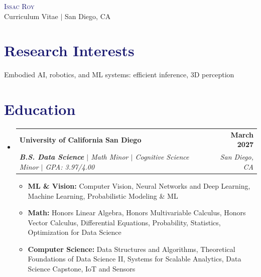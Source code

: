 \documentclass[letterpaper,11pt]{article}
\makeatletter
\newcommand{\resumeItem}[1]{
  \item\small{
    {#1\vspace{\bulletGap}}
  }
}
\newcommand{\resumeSubheading}[4]{
  \item
    \begin{tabular*}{1.0\textwidth}[t]{l@{\extracolsep{\fill}}r}
      \textbf{#1} & \textbf{\small #2} \\
      \textit{\small#3} & \textit{\small #4} \\
    \end{tabular*}\vspace{\headingGap}
}
\newcommand{\resumeSubHeadingListStart}{\begin{itemize}[leftmargin=0.0in, label={}]}
\newcommand{\resumeSubHeadingListEnd}{\end{itemize}}
\newcommand{\resumeItemListStart}{\begin{itemize}[itemsep=0pt, parsep=0pt]}
\newcommand{\resumeItemListEnd}{\end{itemize}\vspace{\entryGap}}
\newcommand{\resumeText}[1]{\vspace{\textSectionGap}\small{#1}\vspace{\textSectionEnd}}
\newcommand\accentColor{MidnightBlue}
\newlength{\textSectionGap}\setlength{\textSectionGap}{3pt}     %
\newlength{\textSectionEnd}\setlength{\textSectionEnd}{-4pt}    %
\newlength{\headingGap}\setlength{\headingGap}{-4pt}            %
\newlength{\bulletGap}\setlength{\bulletGap}{0pt}               %
\newlength{\entryGap}\setlength{\entryGap}{-15pt}               %
\makeatother
\begin{document}
\begin{center}
  {\Huge \scshape \textcolor{\accentColor}{Issac Roy}} \\ \vspace{1pt}
  Curriculum Vitae $|$ San Diego, CA \\ \vspace{1pt}
  \small {}
  \vspace{-8pt}
\end{center}

\section{\textcolor{\accentColor}{Research Interests}}
\resumeText{Embodied AI, robotics, and ML systems: efficient inference, 3D perception}

\section{\textcolor{\accentColor}{Education}}
\resumeSubHeadingListStart
\resumeSubheading{University of California San Diego}{March 2027}{\textbf{B.S. Data Science} $|$ Math Minor $|$ Cognitive Science Minor $|$ GPA: 3.97/4.00}{San Diego, CA}
\resumeItemListStart
    \resumeItem{\textbf{ML \& Vision:} Computer Vision, Neural Networks and Deep Learning, Machine Learning, Probabilistic Modeling \& ML}
    \resumeItem{\textbf{Math:} Honors Linear Algebra, Honors Multivariable Calculus, Honors Vector Calculus, Differential Equations, Probability, Statistics, Optimization for Data Science}
    \resumeItem{\textbf{Computer Science:} Data Structures and Algorithms, Theoretical Foundations of Data Science II, Systems for Scalable Analytics, Data Science Capstone, IoT and Sensors}
\resumeItemListEnd
\resumeSubHeadingListEnd

\end{document}
